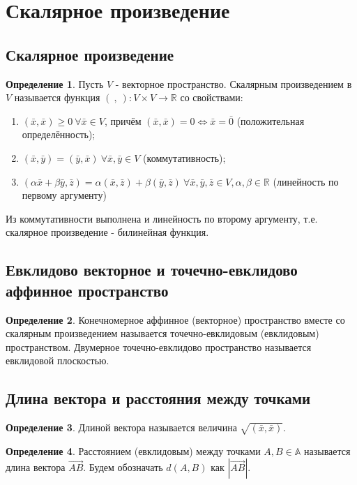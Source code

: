 \documentclass[a4paper, 12pt]{article}
\theoremstyle{definition}
\newtheorem*{definition}{Определение}
\begin{document}
	\section{Скалярное произведение}
	\subsection{Скалярное произведение}
	\begin{definition}
		Пусть $V$ - векторное пространство. Скалярным произведением в $V$ называется функция $(\ ,\ ) : V \times V \rightarrow \mathbb{R}$ со свойствами:
		\begin{enumerate}
			\item $(\bar{x}, \bar{x}) \geqslant 0 \ \forall \bar{x} \in V$, причём $(\bar{x}, \bar{x}) = 0 \Leftrightarrow \bar{x} = \bar{0}$ (положительная определённость);
			\item $(\bar{x}, \bar{y}) = (\bar{y}, \bar{x}) \ \forall \bar{x}, \bar{y} \in V$ (коммутативность);
			\item $(\alpha\bar{x} + \beta\bar{y}, \bar{z}) = \alpha(\bar{x}, \bar{z}) + \beta(\bar{y}, \bar{z}) \ \forall \bar{x}, \bar{y}, \bar{z} \in V, \alpha,\beta \in \mathbb{R}$ (линейность по первому аргументу)
		\end{enumerate} 
	\end{definition}
	Из коммутативности выполнена и линейность по второму аргументу, т.е. скалярное произведение - билинейная функция.
	\subsection{Евклидово векторное и точечно-евклидово аффинное пространство}
	\begin{definition}
		Конечномерное аффинное (векторное) пространство вместе со скалярным произведением называется точечно-евклидовым (евклидовым) пространством. Двумерное точечно-евклидово пространство называется евклидовой плоскостью.
	\end{definition}
	\subsection{Длина вектора и расстояния между точками}
	\begin{definition}
		Длиной вектора называется величина $\sqrt{(\bar{x}, \bar{x})}$.
	\end{definition}
	\begin{definition}
		Расстоянием (евклидовым) между точками $A,B \in \mathbb{A}$ называется длина вектора $\overrightarrow{AB}$. Будем обозначать $d(A, B)$ как $|\overrightarrow{AB}|$. 
	\end{definition}
\end{document}
